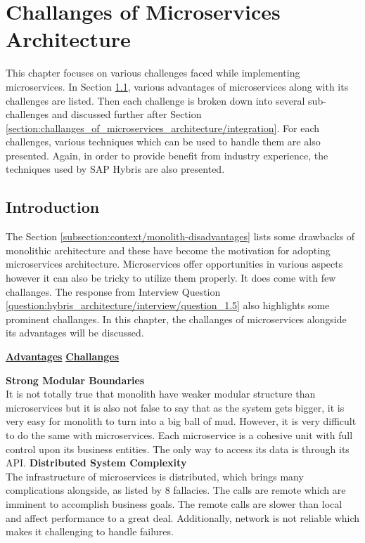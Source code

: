 \chapter{Challanges of Microservices Architecture}\label{chapter:challanges_of_microservices_architecture}
This chapter focuses on various challenges faced while implementing microservices. In Section \ref{section:challanges_of_microservices_architecture/introduction}, various advantages of microservices along with its challenges are listed. Then each challenge is broken down into several sub-challenges and discussed further after Section \ref{section:challanges_of_microservices_architecture/integration}. For each challenges, various techniques which can be used to handle them are also presented. Again, in order to provide benefit from industry experience, the techniques used by SAP Hybris are also presented.
\section{Introduction}\label{section:challanges_of_microservices_architecture/introduction}
The Section \ref{subsection:context/monolith-disadvantages} lists some drawbacks of monolithic architecture and these have become the motivation for adopting microservices architecture. Microservices offer opportunities in various aspects however it can also be tricky to utilize them properly. It does come with few challanges. The response from Interview Question \ref{question:hybris_architecture/interview/question_1.5} also highlights some prominent challanges. In this chapter, the challanges of microservices alongside its advantages will be discussed. \cite{Fowler:2015aa}

\label{section:challanges_of_microservices_architecture/introduction/challenges}
  \begin{multicols}{2}
  \textbf{\underline{Advantages}} 
  \vfill
  \columnbreak
  \textbf{\underline{Challanges}}
  \end{multicols}
  \begin{multicols}{2}
  \textbf{Strong Modular Boundaries} \\It is not totally true that monolith have weaker modular structure than microservices but it is also not false to say that as the system gets bigger, it is very easy for monolith to turn into a big ball of mud. However, it is very difficult to do the same with microservices. Each microservice is a cohesive unit with full control upon its business entities. The only way to access its data is through its \acrshort{API}.
  \vfill
  \columnbreak
  \textbf{Distributed System Complexity} \\The infrastructure of microservices is distributed, which brings many complications alongside, as listed by 8 fallacies.\cite{Factor:2014aa} The calls are remote which are imminent to accomplish business goals. The remote calls are slower than local and affect performance to a great deal. Additionally, network is not reliable which makes it challenging to handle failures.
  \end{multicols}

